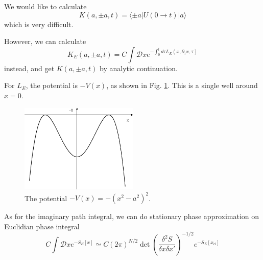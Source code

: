 \documentclass[12pt]{book}
\begin{document}
	We would like to calculate
	\begin{equation}
		K(a,\pm a,t)=\langle \pm a|U(0\rightarrow t)|a\rangle
	\end{equation}
	which is very difficult.
	
	However, we can calculate
	\begin{equation}
		K_E(a,\pm a,t)=C\int \mathcal Dxe^{-\int_{0}^{t}d\tau L_E(x,\partial_\tau x,\tau)}
	\end{equation}
	instead, and get $K(a,\pm a,t)$ by analytic continuation.
	
	For $L_E$, the potential is $-V(x)$, as shown in Fig. \ref{fig:invdblwell}. This is a single well around $x=0$.
	\begin{figure}[htb!]
		\centering  
		\includegraphics[width=0.5\textwidth]{resources/chap_path_int/invdoublewell.pdf}
		\caption{The potential $-V(x)=-(x^2-a^2)^2$.}
		\label{fig:invdblwell} 
	\end{figure}
	
	As for the imaginary path integral, we can do stationary phase approximation on Euclidian phase integral
	\begin{equation}
		C\int \mathcal Dxe^{-S_E[x]}\simeq C(2\pi)^{N/2}\det(\frac{\delta^2 S}{\delta x\delta x'})^{-1/2}e^{-S_E[x_{cl}]}
	\end{equation}
	
\end{document}
